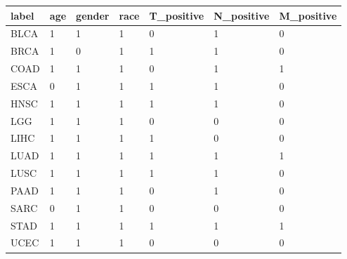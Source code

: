 \begin{table}[ht]
\centering
\begin{tabular}{lllllll}
  \hline
label & age & gender & race & T\_positive & N\_positive & M\_positive \\ 
  \hline
BLCA & 1 & 1 & 1 & 0 & 1 & 0 \\ 
  BRCA & 1 & 0 & 1 & 1 & 1 & 0 \\ 
  COAD & 1 & 1 & 1 & 0 & 1 & 1 \\ 
  ESCA & 0 & 1 & 1 & 1 & 1 & 0 \\ 
  HNSC & 1 & 1 & 1 & 1 & 1 & 0 \\ 
  LGG & 1 & 1 & 1 & 0 & 0 & 0 \\ 
  LIHC & 1 & 1 & 1 & 1 & 0 & 0 \\ 
  LUAD & 1 & 1 & 1 & 1 & 1 & 1 \\ 
  LUSC & 1 & 1 & 1 & 1 & 1 & 0 \\ 
  PAAD & 1 & 1 & 1 & 0 & 1 & 0 \\ 
  SARC & 0 & 1 & 1 & 0 & 0 & 0 \\ 
  STAD & 1 & 1 & 1 & 1 & 1 & 1 \\ 
  UCEC & 1 & 1 & 1 & 0 & 0 & 0 \\ 
   \hline
\end{tabular}
\end{table}
